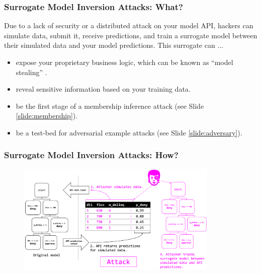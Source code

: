 \documentclass[11pt,
               aspectratio=169,
               hyperref={colorlinks}
               ]{beamer}
\begin{document}
			\begin{frame}
		
				\frametitle{Surrogate Model Inversion Attacks: \textbf{What?}}
				
Due to a lack of security or a distributed attack on your model API, hackers can simulate data, submit it, receive predictions, and train a surrogate model between their simulated data and your model predictions. This surrogate can ...
				\vspace{10pt}
				\begin{itemize}
				\item expose your proprietary business logic, which can be known as ``model stealing'' \cite{model_stealing}. 
				\item reveal sensitive information based on your training data.
				\item be the first stage of a membership inference attack (see Slide \ref{slide:membership}).
				\item be a test-bed for adversarial example attacks (see Slide \ref{slide:adversary}). 
				\end{itemize}

			\end{frame}
		
			\begin{frame}[label={slide:inversion}]
		
				\frametitle{Surrogate Model Inversion Attacks: \textbf{How?}}	
			
				\begin{figure}[htb]
					\begin{center}
						\includegraphics[height=150pt]{img/inversion.PNG}
					\end{center}
				\end{figure}	

			\end{frame}
		
\end{document}
